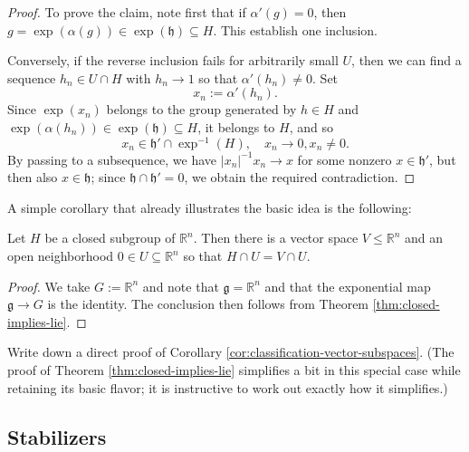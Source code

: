 \documentclass[reqno]{amsart} 
\begin{document}
\begin{proof}
  To prove the claim, note first that if $\alpha '(g) = 0$, then $g = \exp(\alpha(g)) \in \exp(\mathfrak{h}) \subseteq H$.  This establish one inclusion.

  Conversely, if the reverse inclusion fails for arbitrarily small $U$, then we can find a sequence $h_n \in U \cap H$ with $h_n \rightarrow 1$ so that $\alpha '(h_n) \neq 0$.  Set 
\begin{equation*}
x_n := \alpha '(h_n).
\end{equation*}
 Since $\exp(x_n)$ belongs to the group generated by $h \in H$ and $\exp(\alpha(h_n)) \in \exp(\mathfrak{h}) \subseteq H$, it belongs to $H$, and so
  \begin{equation*}
    x_n \in \mathfrak{h} ' \cap \exp^{-1}(H), \quad x_n \rightarrow 0, x_n \neq 0.
  \end{equation*}
  By passing to a subsequence, we have $|x_n|^{-1} x_n \rightarrow x$ for some nonzero $x \in \mathfrak{h} '$, but then also $x \in \mathfrak{h}$; since $\mathfrak{h} \cap \mathfrak{h} ' = 0$, we obtain the required contradiction.
\end{proof}

A simple corollary that already illustrates the basic idea is the following:
\begin{corollary}\label{cor:classification-vector-subspaces}
  Let $H$ be a closed subgroup of $\mathbb{R}^n$.  Then there is a vector space $V \leq \mathbb{R}^n$ and an open neighborhood $0 \in U \subseteq \mathbb{R}^n$ so that $H \cap U = V \cap U$.
\end{corollary}
\begin{proof}
  We take $G := \mathbb{R}^n$ and note that $\mathfrak{g} = \mathbb{R}^n$ and that the exponential map $\mathfrak{g} \rightarrow G$ is the identity.  The conclusion then follows from Theorem \ref{thm:closed-implies-lie}.
\end{proof}

\begin{exercise}
  Write down a direct proof of Corollary \ref{cor:classification-vector-subspaces}.  (The proof of Theorem \ref{thm:closed-implies-lie} simplifies a bit in this special case while retaining its basic flavor; it is instructive to work out exactly how it simplifies.)
\end{exercise}

\subsection{Stabilizers\label{sec:detect-lie-stabilizers}}
\label{sec:orgca48d81}
\end{document}
